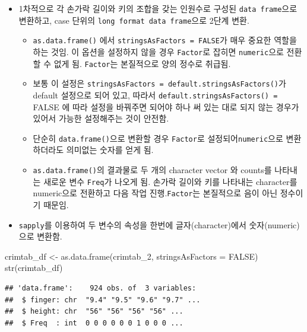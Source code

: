 \documentclass[
]{article}
\newenvironment{Shaded}{\begin{snugshade}}{\end{snugshade}}
\newcommand{\AttributeTok}[1]{\textcolor[rgb]{0.77,0.63,0.00}{#1}}
\newcommand{\ConstantTok}[1]{\textcolor[rgb]{0.00,0.00,0.00}{#1}}
\newcommand{\FunctionTok}[1]{\textcolor[rgb]{0.00,0.00,0.00}{#1}}
\newcommand{\NormalTok}[1]{#1}
\newcommand{\OtherTok}[1]{\textcolor[rgb]{0.56,0.35,0.01}{#1}}
\providecommand{\tightlist}{%
  \setlength{\itemsep}{0pt}\setlength{\parskip}{0pt}}
\begin{document}
\begin{itemize}
\tightlist
\item
  1차적으로 각 손가락 길이와 키의 조합을 갖는 인원수로 구성된
  \texttt{data\ frame}으로 변환하고, case 단위의
  \texttt{long\ format\ data\ frame}으로 2단계 변환.

  \begin{itemize}
  \tightlist
  \item
    \texttt{as.data.frame()} 에서 \texttt{stringsAsFactors\ =\ FALSE}가
    매우 중요한 역할을 하는 것임. 이 옵션을 설정하지 않을 경우
    \texttt{Factor}로 잡히면 \texttt{numeric}으로 전환할 수 없게 됨.
    \texttt{Factor}는 본질적으로 양의 정수로 취급됨.
  \item
    보통 이 설정은
    \texttt{stringsAsFactors\ =\ default.stringsAsFactors()}가 default
    설정으로 되어 있고, 따라서 \texttt{default.stringsAsFactors()\ =}
    FALSE 에 따라 설정을 바꿔주면 되어야 하나 써 있는 대로 되지 않는
    경우가 있어서 가능한 설정해주는 것이 안전함.
  \item
    단순히 \texttt{data.frame()}으로 변환할 경우 \texttt{Factor}로
    설정되어\texttt{numeric}으로 변환하더라도 의미없는 숫자를 얻게 됨.
  \item
    \texttt{as.data.frame()}의 결과물로 두 개의 character vector 와
    counts를 나타내는 새로운 변수 \texttt{Freq}가 나오게 됨. 손가락
    길이와 키를 나타내는 character를 numeric으로 전환하고 다음 작업
    진행.\texttt{Factor}는 본질적으로 음이 아닌 정수이기 때문임.
  \end{itemize}
\item
  \texttt{sapply}를 이용하여 두 변수의 속성을 한번에 글자(character)에서
  숫자(numeric)으로 변환함.
\end{itemize}

\begin{Shaded}
\begin{Highlighting}[]
\NormalTok{crimtab\_df }\OtherTok{\textless{}{-}} \FunctionTok{as.data.frame}\NormalTok{(crimtab\_2, }
                            \AttributeTok{stringsAsFactors =} \ConstantTok{FALSE}\NormalTok{)}
\FunctionTok{str}\NormalTok{(crimtab\_df)}
\end{Highlighting}
\end{Shaded}

\begin{verbatim}
## 'data.frame':    924 obs. of  3 variables:
##  $ finger: chr  "9.4" "9.5" "9.6" "9.7" ...
##  $ height: chr  "56" "56" "56" "56" ...
##  $ Freq  : int  0 0 0 0 0 0 1 0 0 0 ...
\end{verbatim}
\end{document}
